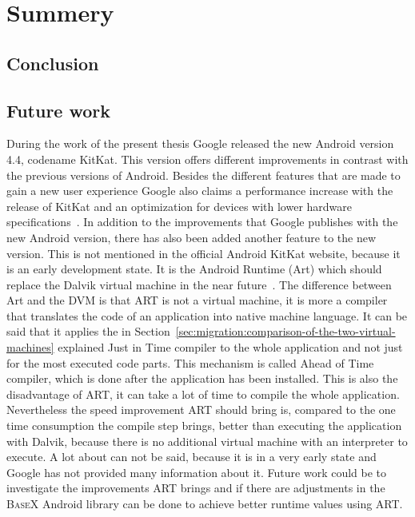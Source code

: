 \chapter{Summery}
\label{cha:summery}
\section{Conclusion}
\label{sec:summery:conclusion}
\section{Future work}
\label{sec:summery:future-work}
During the work of the present thesis Google released the new Android version 4.4, codename KitKat.
This version offers different improvements in contrast with the previous versions of Android.
Besides the different features that are made to gain a new user experience Google also claims a performance increase with the release of KitKat and an optimization for devices with lower hardware specifications~\cite{google-kitkat}.
In addition to the improvements that Google publishes with the new Android version, there has also been added another feature to the new version.
This is not mentioned in the official Android KitKat website, because it is an early development state.
It is the Android Runtime (Art) which should replace the Dalvik virtual machine in the near future~\cite{android-art}.
The difference between Art and the DVM is that ART is not a virtual machine, it is more a compiler that translates the code of an application into native machine language.
It can be said that it applies the in Section~\ref{sec:migration:comparison-of-the-two-virtual-machines} explained Just in Time compiler to the whole application and not just for the most executed code parts.
This mechanism is called Ahead of Time compiler, which is done after the application has been installed.
This is also the disadvantage of ART, it can take a lot of time to compile the whole application.
Nevertheless the speed improvement ART should bring is, compared to the one time consumption the compile step brings, better than executing the application with Dalvik, because there is no additional virtual machine with an interpreter to execute.
A lot about can not be said, because it is in a very early state and Google has not provided many information about it.
Future work could be to investigate the improvements ART brings and if there are adjustments in the \textsc{BaseX} Android library can be done to achieve better runtime values using ART.

